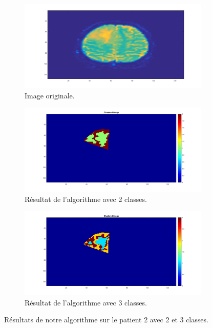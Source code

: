 \begin{figure}[H]
\centering
\begin{subfigure}{.5\textwidth}
    \centering
    \includegraphics[scale=0.2,angle=0]{Images/TrueclassBrain.png}
    \caption{Image originale.}
    \label{fig:TrueclassBrain} 
\end{subfigure}
\begin{subfigure}{.33\textwidth}
    \centering
    \includegraphics[scale=0.2,angle=0]{Images/2classBrain.png}
    \caption{Résultat de l'algorithme avec 2 classes.}
    \label{fig:2classBrain} 
\end{subfigure}
\begin{subfigure}{.33\textwidth}
    \centering
    \includegraphics[scale=0.2,angle=0]{Images/3classBrain.png}
    \caption{Résultat de l'algorithme avec 3 classes.}
    \label{fig:3classBrain} 
\end{subfigure}
    \caption{Résultats de notre algorithme sur le patient 2 avec 2 et 3 classes.}
    \label{fig:2and3classBrain} 
\end{figure}

